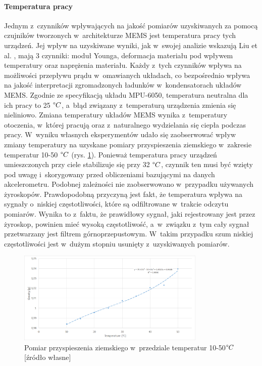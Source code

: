 \paragraph*{Temperatura pracy}
Jednym z~czynników wpływających na jakość pomiarów uzyskiwanych za pomocą czujników tworzonych w~architekturze MEMS jest temperatura pracy tych urządzeń. Jej wpływ na uzyskiwane wyniki, jak w~swojej analizie wskazują Liu et al. \cite{Liu2007, Liu2015}, mają 3 czynniki: moduł Younga, deformacja materiału pod wpływem temperatury oraz naprężenia materiału. Każdy z~tych czynników wpływa na możliwości przepływu prądu w~omawianych układach, co bezpośrednio wpływa na jakość interpretacji zgromadzonych ładunków w~kondensatorach układów MEMS. Zgodnie ze specyfikacją układu MPU-6050, temperatura neutralna dla ich pracy to 25 $\degree C$, a~błąd związany z~temperaturą urządzenia zmienia się nieliniowo. Zmiana temperatury układów MEMS wynika z~temperatury otoczenia, w~której pracują oraz z~naturalnego wydzielania się ciepła podczas pracy. W~wyniku własnych eksperymentów udało się zaobserwować wpływ zmiany temperatury na uzyskane pomiary przyspieszenia ziemskiego w~zakresie temperatur 10-50 $\degree C$ (rys. \ref{fig:characteristics:imu:temp}). Ponieważ temperatura pracy urządzeń umieszczonych przy ciele stabilizuje się przy 32 $\degree C$, czynnik ten musi być wzięty pod uwagę i~skorygowany przed obliczeniami bazującymi na danych akcelerometru. Podobnej zależności nie zaobserwowano w~przypadku używanych żyroskopów. Prawdopodobną przyczyną jest fakt, że temperatura wpływa na sygnały o~niskiej częstotliwości, które są odfiltrowane w~trakcie odczytu pomiarów. Wynika to z~faktu, że prawidłowy sygnał, jaki rejestrowany jest przez żyroskop, powinien mieć wysoką częstotliwość, a~w~związku z~tym cały sygnał przetwarzany jest filtrem górnoprzepustowym. W~takim przypadku szum niskiej częstotliwości jest w~dużym stopniu usunięty z~uzyskiwanych pomiarów.
																																															
\begin{savenotes}
	\begin{figure}
		\centering
		\includegraphics[width=0.8\textwidth]{images/temp.png}
		\caption[Pomiar przyspieszenia ziemskiego w~przedziale temperatur 10-50$\degree C$]{Pomiar przyspieszenia ziemskiego w~przedziale temperatur 10-50$\degree C$ [źródło własne]}
		\label{fig:characteristics:imu:temp}
	\end{figure}
\end{savenotes}
																																																	
